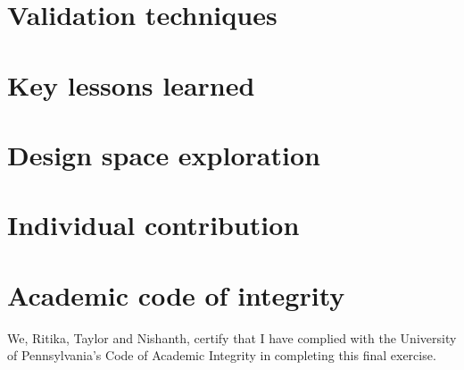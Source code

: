 \documentclass{article}
\begin{document}
\section{Validation techniques}

\section{Key lessons learned}

\section{Design space exploration}

\section{Individual contribution}

\section{Academic code of integrity}
We, Ritika, Taylor and Nishanth, certify that I have complied with the University of Pennsylvania’s Code of Academic Integrity in completing this final exercise.
\end{document}
